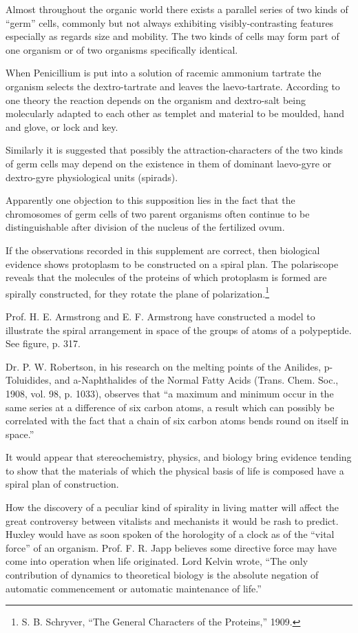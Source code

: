 \documentclass[a4paper, 12pt, oneside]{article}
\begin{document}
Almost throughout the organic world there exists a parallel series of two kinds of ``germ'' cells, commonly but not always exhibiting visibly-contrasting features especially as regards size and mobility. The two kinds of cells may form part of one organism or of two organisms specifically identical.

When Penicillium is put into a solution of racemic ammonium tartrate the organism selects the dextro-tartrate and leaves the laevo-tartrate. According to one theory the reaction depends on the organism and dextro-salt being molecularly adapted to each other as templet and material to be moulded, hand and glove, or lock and key.

Similarly it is suggested that possibly the attraction-characters of the two kinds of germ cells may depend on the existence in them of dominant laevo-gyre or dextro-gyre physiological units (spirads).

Apparently one objection to this supposition lies in the fact that the chromosomes of germ cells of two parent organisms often continue to be distinguishable after division of the nucleus of the fertilized ovum.

If the observations recorded in this supplement are correct, then biological evidence shows protoplasm to be constructed on a spiral plan. The polariscope reveals that the molecules of the proteins of which protoplasm is formed are spirally constructed, for they rotate the plane of polarization.\footnote{S. B. Schryver, ``The General Characters of the Proteins,'' 1909.}

Prof. H. E. Armstrong and E. F. Armstrong have constructed a model to illustrate the spiral arrangement in space of the groups of atoms of a polypeptide. See figure, p. 317.

Dr. P. W. Robertson, in his research on the melting points of the Anilides, p-Toluidides, and a-Naphthalides of the Normal Fatty Acids (Trans. Chem. Soc., 1908, vol. 98, p. 1033), observes that ``a maximum and minimum occur in the same series at a difference of six carbon atoms, a result which can possibly be correlated with the fact that a chain of six carbon atoms bends round on itself in space.''

It would appear that stereochemistry, physics, and biology bring evidence tending to show that the materials of which the physical basis of life is composed have a spiral plan of construction.

How the discovery of a peculiar kind of spirality in living matter will affect the great controversy between vitalists and mechanists it would be rash to predict. Huxley would have as soon spoken of the horologity of a clock as of the ``vital force'' of an organism. Prof. F. R. Japp believes some directive force may have come into operation when life originated. Lord Kelvin wrote, ``The only contribution of dynamics to theoretical biology is the absolute negation of automatic commencement or automatic maintenance of life.''
\end{document}
